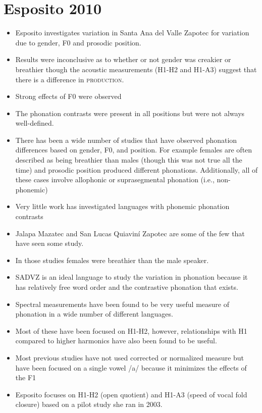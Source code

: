 \documentclass[12pt, letterpaper]{article}
\begin{document}
\section{Esposito 2010} \label{sec:Esposito}

\begin{itemize}
	\item Esposito investigates variation in Santa Ana del Valle Zapotec for variation due to gender, F0 and prosodic position.
	\item Results were inconclusive as to whether or not gender was creakier or breathier though the acoustic measurements (H1-H2 and H1-A3) suggest that there is a difference in \textsc{production}. 
	\item Strong effects of F0 were observed
	\item The phonation contrasts were present in all positions but were not always well-defined. 
	\item There has been a wide number of studies that have observed phonation differences based on gender, F0, and position. For example females are often described as being breathier than males (though this was not true all the time) and prosodic position produced different phonations. Additionally, all of these cases involve allophonic or suprasegmental phonation (i.e., non-phonemic)
	\item Very little work has investigated languages with phonemic phonation contrasts
	\item Jalapa Mazatec and San Lucas Quiaviní Zapotec are some of the few that have seen some study.
	\item In those studies females were breathier than the male speaker. 
	\item SADVZ is an ideal language to study the variation in phonation because it has relatively free word order and the contrastive phonation that exists. 
	\item Spectral measurements have been found to be very useful measure of phonation in a wide number of different languages. 
	\item Most of these have been focused on H1-H2, however, relationships with H1 compared to higher harmonics have also been found to be useful. 
	\item Most previous studies have not used corrected or normalized measure but have been focused on a single vowel /a/ because it minimizes the effects of the F1
	\item Esposito focuses on H1-H2 (open quotient) and H1-A3 (speed of vocal fold closure) based on a pilot study she ran in 2003. 

\end{itemize}
\end{document}
